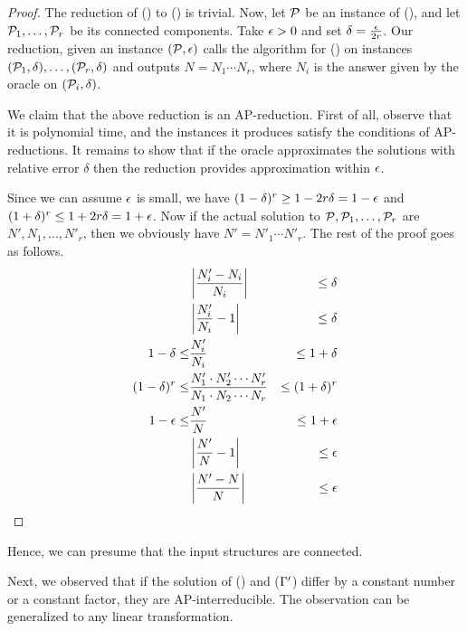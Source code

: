 \begin{proof}
The reduction of \cccsp(\mrelset) to \ccsp(\mrelset) is trivial. Now, let \(\mathcal{P}\) be an instance of
\ccsp(\mrelset), and let \(\mathcal{P}_1,\dotsc,\mathcal{P}_r\) be its connected components. Take \(\epsilon > 0\) 
and set \(\delta = \frac{\epsilon}{2r}\)\@. Our reduction, given an instance \((\mathcal{P},\epsilon)\) calls
the algorithm for \cccsp(\mrelset) on instances \((\mathcal{P}_1,\delta), \dotsc,(\mathcal{P}_r,\delta)\) 
and outputs \(N = N_1 \dotsm N_r\),
where \(N_i\) is the answer given by the oracle on \((\mathcal{P}_i,\delta)\)\@.

We claim that the above reduction is an AP-reduction. First of all, observe that it is polynomial
time, and the instances it produces satisfy the conditions of AP-reductions. It remains to show
that if the oracle approximates the solutions with relative error \(\delta\) then the reduction 
provides approximation within \(\epsilon\)\@.

Since we can assume \(\epsilon\) is small, we have \((1 - \delta)^r \ge 1 - 2r\delta = 1 - \epsilon \) and
\( ( 1 + \delta)^r \le 1 + 2r\delta = 1 + \epsilon\)\@. Now if 
the actual solution to \(\mathcal{P}, \mathcal{P}_1,\dotsc,\mathcal{P}_r\) are \(N',N_1,\dotsc,N'_r\), then 
we obviously have \(N'=N'_1\dotsm N'_r\)\@. The rest of the proof goes as follows.
\begin{eqnarray*}
&\left|\frac{N'_i - N_i}{N_i}\right| &\le \delta \\
&\left|\frac{N'_i}{N_i} -1 \right| &\le \delta \\
1 - \delta  \le &\frac{N'_i}{N_i} &\le 1 + \delta \\
(1-\delta)^r \le &\frac{N'_1\cdot N'_2 \dotsm N'_r}{N_1\cdot N_2 \dotsm N_r} &\le (1 + \delta)^r \\
1-\epsilon \le &\frac{N'}{N} &\le 1+\epsilon \\
&\left|\frac{N'}{N}-1\right|&\le \epsilon\\
&\left|\frac{N'-N}{N}\right|&\le \epsilon\\
\end{eqnarray*}
\end{proof}

Hence, we can presume that the input structures are connected.

Next, we observed that if the solution of \ccsp(\mrelset) and \ccsp(\(\Gamma'\))
differ by a constant number or a constant factor, they are AP-interreducible. The observation
can be generalized to any linear transformation. 

